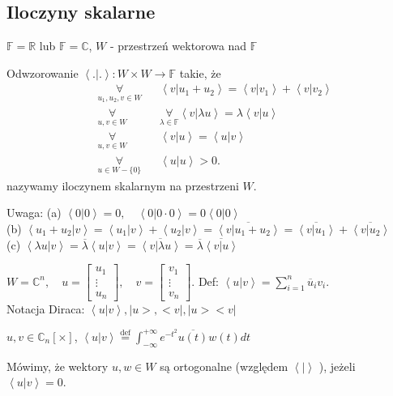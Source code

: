 \documentclass[../main.tex]{subfiles}
\begin{document}
\subsection{Iloczyny skalarne}
$\mathbb{F} = \mathbb{R}$ lub $\mathbb{F} = \mathbb{C}$, $W$ - przestrzeń wektorowa nad $\mathbb{F}$
\begin{definicja}
    Odwzorowanie $\left<.|. \right>: W\times W\to \mathbb{F}$ takie, że
    \begin{align}
        &\underset{u_1,u_2,v \in W}{\forall} &&\left<v|u_1+u_2 \right> = \left<v|v_1 \right>+ \left<v|v_2 \right>\\
        &\underset{u,v \in W}{\forall} &&\underset{\lambda \in \mathbb{F}}{\forall} \left<v|\lambda u \right> = \lambda \left<v|u \right>\\
        &\underset{u,v \in W}{\forall}  &&\left<v|u \right> = \left<u | v \right>\\
        &\underset{u \in W-\{0\}}{\forall}  &&\left<u|u \right> > 0
    .\end{align}
    nazywamy iloczynem skalarnym na przestrzeni  $W$.
\end{definicja}
Uwaga: (a) $\left<0|0 \right> = 0,\quad \left<0|0\cdot 0 \right> = 0\left<0|0 \right>$\\
(b) $\left<u_1+u_2|v \right> =  \left<u_1|v \right> + \left<u_2|v \right> = \overline{\left<v|u_1+u_2 \right>} = \overline{\left<v|u_1 \right>} + \overline{\left<v|u_2 \right>}$ \\
(c) $\left<\lambda u|v \right> = \overline{\lambda} \left<u|v \right> = \overline{\left<v|\lambda u \right>} = \overline{\lambda} \overline{\left< v|u\right>}$
\begin{przyklad}
    $W = \mathbb{C}^n,\quad u = \begin{bmatrix} u_1\\\vdots\\u_n \end{bmatrix} ,\quad v = \begin{bmatrix} v_1\\ \vdots \\ v_n \end{bmatrix} $. Def: $\left<u|v \right> = \sum_{i=1}^n \overline{u}_i v_i$.\\
    Notacja Diraca: $\left<u|v \right>, |u>, <v|, |u><v|$
\end{przyklad}
\begin{przyklad}
    $u,v\in \mathbb{C}_n [\times]$, $\left<u|v \right> \overset{\text{def}}{=} \int_{-\infty}^{+\infty} e^{-t^2} \overline{u(t)} w(t) dt$
\end{przyklad}
\begin{definicja}
    Mówimy, że wektory $u,w\in W$ są ortogonalne (względem $\left<| \right>$ ), jeżeli $\left<u|v \right> = 0$.
\end{definicja}
\end{document}
